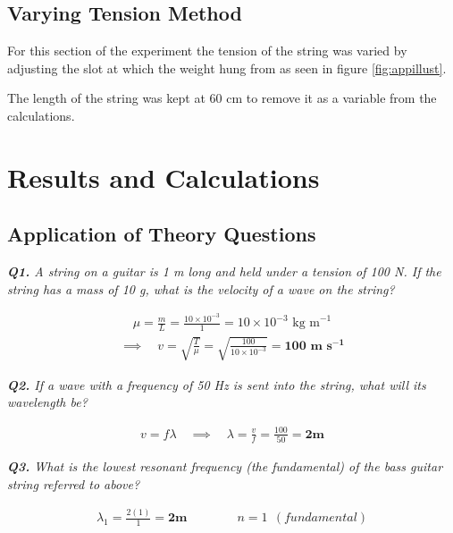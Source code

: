 \documentclass[12pt]{article}
\begin{document}
\subsection{Varying Tension Method}

For this section of the experiment the tension of the string was varied by adjusting the slot at which the weight hung from as seen in figure \ref{fig:appillust}.

The length of the string was kept at 60 cm to remove it as a variable from the calculations.

\section{Results and Calculations} \label{sec:3}

\subsection{Application of Theory Questions}

\textit{\textbf{Q1.} A string on a guitar is 1 m long and held under a tension of 100 N. If the string has a mass of 10 g, what is the velocity of a wave on the string?}

\vspace{-1.5ex}
\begin{gather*}
    \mu = \frac{m}{L} = \frac{10 \times 10^{-3}}{1} = 10 \times 10^{-3} \text{ kg m}^{-1}
\end{gather*}
\begin{gather*}
    \implies \quad v = \sqrt{\frac{T}{\mu}} = \sqrt{\frac{100}{10 \times 10^{-3}}} = \mathbf{100 \textbf{ m s}^{-1}}
\end{gather*}

\textit{\textbf{Q2.} If a wave with a frequency of 50 Hz is sent into the string, what will its wavelength be?}

\vspace{-1.5ex}
\begin{gather*}
    v = f \lambda \quad \implies \quad \lambda = \frac{v}{f} = \frac{100}{50} = \mathbf{2} \textbf{m}
\end{gather*}

\textit{\textbf{Q3.} What is the lowest resonant frequency (the fundamental) of the bass guitar string referred to above?}

\vspace{-1.5ex}
\begin{gather*}
    \lambda_{1} = \frac{2(1)}{1} = \mathbf{2} \textbf{m} \qquad\qquad n = 1 \:\: (fundamental) 
\end{gather*}
\end{document}
